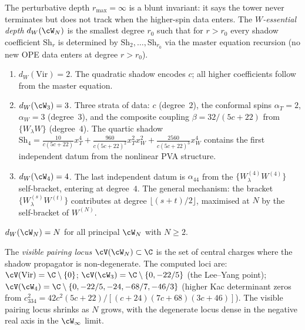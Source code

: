 \begin{remark}
\label{rem:w-essential-depth-summary}
The perturbative depth $r_{\max} = \infty$ is a blunt invariant:
it says the tower never terminates but does not track when the
higher-spin data enters. The \emph{$W$-essential depth}
$d_W(\cW_N)$ is the smallest degree $r_0$ such that for $r > r_0$
every shadow coefficient $\mathrm{Sh}_r$ is determined by
$\mathrm{Sh}_2, \ldots, \mathrm{Sh}_{r_0}$ via the master equation
recursion (no new OPE data enters at degree $r > r_0$).
\end{remark}

\begin{proposition}[$W$-essential depth for $N = 2, 3, 4$;
\ClaimStatusProvedHere]
\label{prop:w-essential-depth-computed}
\leavevmode
\begin{enumerate}[label=\textup{(\roman*)}]
\item $d_W(\mathrm{Vir}) = 2$. The quadratic shadow encodes $c$;
 all higher coefficients follow from the master equation.
\item $d_W(\cW_3) = 3$. Three strata of data: $c$ (degree~$2$),
 the conformal spins $\alpha_T = 2$, $\alpha_W = 3$ (degree~$3$),
 and the composite coupling $\beta = 32/(5c+22)$ from
 $\{W_\lambda W\}$ (degree~$4$). The quartic shadow
 $\mathrm{Sh}_4 = \frac{10}{c(5c+22)}x_T^4
 + \frac{960}{c(5c+22)^2}x_T^2 x_W^2
 + \frac{2560}{c(5c+22)^3}x_W^4$
 contains the first independent datum from the nonlinear
 PVA structure.
\item $d_W(\cW_4) = 4$. The last independent datum is $\alpha_{44}$
 from the $\{W^{(4)}_\lambda W^{(4)}\}$ self-bracket, entering at
 degree~$4$. The general mechanism: the bracket
 $\{W^{(s)}_\lambda W^{(t)}\}$ contributes at degree
 $\lfloor(s+t)/2\rfloor$, maximised at $N$ by the self-bracket
 of $W^{(N)}$.
\end{enumerate}
\end{proposition}

\begin{conjecture}
\label{conj:w-essential-depth-ext}
$d_W(\cW_N) = N$ for all principal $\cW_N$ with $N \ge 2$.
\end{conjecture}

\begin{remark}
\label{rem:visible-pairing-locus}
The \emph{visible pairing locus} $\cV(\cW_N) \subset \C$ is the
set of central charges where the shadow propagator is non-degenerate.
The computed loci are:
$\cV(\mathrm{Vir}) = \C \setminus \{0\}$;
$\cV(\cW_3) = \C \setminus \{0, -22/5\}$ (the Lee--Yang point);
$\cV(\cW_4) = \C \setminus \{0, -22/5, -24, -68/7, -46/3\}$
(higher Kac determinant zeros from
$c_{334}^2 = 42c^2(5c+22)/[(c+24)(7c+68)(3c+46)]$).
The visible pairing locus shrinks as $N$ grows, with the degenerate
locus dense in the negative real axis in the $\cW_\infty$ limit.
\end{remark}

